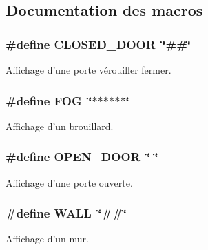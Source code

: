 \subsection{Documentation des macros}
\subsubsection[{C\-L\-O\-S\-E\-D\-\_\-\-D\-O\-O\-R}]{\setlength{\rightskip}{0pt plus 5cm}\#define C\-L\-O\-S\-E\-D\-\_\-\-D\-O\-O\-R~\char`\"{}\#\#\char`\"{}}\label{_room_8hpp_a29d36cae5c3f9bdaf1564cb5e2bdef6b}


Affichage d'une porte vérouiller fermer. 

\subsubsection[{F\-O\-G}]{\setlength{\rightskip}{0pt plus 5cm}\#define F\-O\-G~\char`\"{}$\ast$$\ast$$\ast$$\ast$$\ast$$\ast$\char`\"{}}\label{_room_8hpp_a209f742e82b8a8dae6e522618e973c35}


Affichage d'un brouillard. 

\subsubsection[{O\-P\-E\-N\-\_\-\-D\-O\-O\-R}]{\setlength{\rightskip}{0pt plus 5cm}\#define O\-P\-E\-N\-\_\-\-D\-O\-O\-R~\char`\"{}  \char`\"{}}\label{_room_8hpp_ab972c5b46a018dcf27daca00fce8f37d}


Affichage d'une porte ouverte. 

\subsubsection[{W\-A\-L\-L}]{\setlength{\rightskip}{0pt plus 5cm}\#define W\-A\-L\-L~\char`\"{}\#\#\char`\"{}}\label{_room_8hpp_ac749b87dd5d843e4add3eb8e8a130f62}


Affichage d'un mur. 

